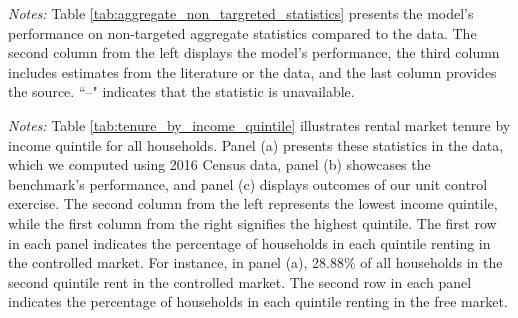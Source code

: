 \documentclass[parskip=full]{article}
\newenvironment{fignote2}[1]
{
\par
\medskip
\begin{minipage}{#1}
\footnotesize
}
{
\end{minipage}
}
\begin{document}
\begin{table}[H]
    \centering
    \caption{Aggregate non-targeted statistics}
    \vspace{-0.5cm}
    \label{tab:aggregate_non_targreted_statistics}  
    \vspace{-0.45cm}
    \begin{fignote2}{0.9\textwidth}
      \textit{Notes:} Table \ref{tab:aggregate_non_targreted_statistics} presents the model's performance on non-targeted aggregate statistics compared to the data. The second column from the left displays the model's performance, the third column includes estimates from the literature or the data, and the last column provides the source. ``--" indicates that the statistic is unavailable.
    \end{fignote2}
\end{table}

\begin{table}[H]
    \centering
    \caption{Rental market tenure by income quintile (all households)}
    \vspace{-0.5cm}
    \label{tab:tenure_by_income_quintile}    
    
    \vspace{-0.45cm}
    \begin{fignote2}{0.66\textwidth}
      \textit{Notes:} Table \ref{tab:tenure_by_income_quintile} illustrates rental market tenure by income quintile for all households. Panel (a) presents these statistics in the data, which we computed using 2016 Census data, panel (b) showcases the benchmark's performance, and panel (c) displays outcomes of our unit control exercise. The second column from the left represents the lowest income quintile, while the first column from the right signifies the highest quintile. The first row in each panel indicates the percentage of households in each quintile renting in the controlled market. For instance, in panel (a), 28.88\% of all households in the second quintile rent in the controlled market. The second row in each panel indicates the percentage of households in each quintile renting in the free market.  
    \end{fignote2}
\end{table}
\end{document}
